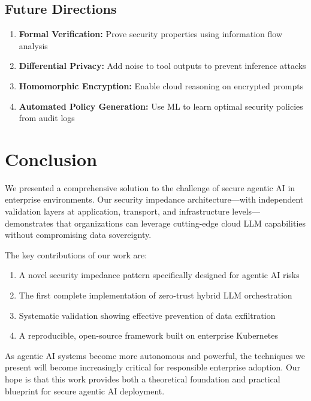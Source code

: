 \documentclass[11pt]{article}
\begin{document}
\subsection{Future Directions}

\begin{enumerate}
\item \textbf{Formal Verification:} Prove security properties using information flow analysis
\item \textbf{Differential Privacy:} Add noise to tool outputs to prevent inference attacks
\item \textbf{Homomorphic Encryption:} Enable cloud reasoning on encrypted prompts
\item \textbf{Automated Policy Generation:} Use ML to learn optimal security policies from audit logs
\end{enumerate}

\section{Conclusion}

We presented a comprehensive solution to the challenge of secure agentic AI in enterprise environments. Our security impedance architecture—with independent validation layers at application, transport, and infrastructure levels—demonstrates that organizations can leverage cutting-edge cloud LLM capabilities without compromising data sovereignty.

The key contributions of our work are:
\begin{enumerate}
\item A novel security impedance pattern specifically designed for agentic AI risks
\item The first complete implementation of zero-trust hybrid LLM orchestration
\item Systematic validation showing effective prevention of data exfiltration
\item A reproducible, open-source framework built on enterprise Kubernetes
\end{enumerate}

As agentic AI systems become more autonomous and powerful, the techniques we present will become increasingly critical for responsible enterprise adoption. Our hope is that this work provides both a theoretical foundation and practical blueprint for secure agentic AI deployment.

\end{document}

